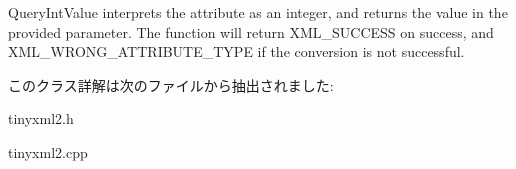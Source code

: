 Query\+Int\+Value interprets the attribute as an integer, and returns the value in the provided parameter. The function will return X\+M\+L\+\_\+\+S\+U\+C\+C\+E\+SS on success, and X\+M\+L\+\_\+\+W\+R\+O\+N\+G\+\_\+\+A\+T\+T\+R\+I\+B\+U\+T\+E\+\_\+\+T\+Y\+PE if the conversion is not successful. 

このクラス詳解は次のファイルから抽出されました\+:\begin{DoxyCompactItemize}
\item 
tinyxml2.\+h\item 
tinyxml2.\+cpp\end{DoxyCompactItemize}
